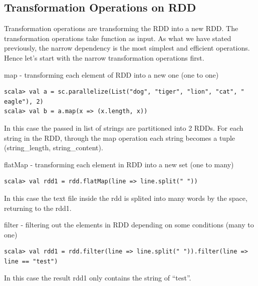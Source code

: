\documentclass[notheorems, aspectratio=54]{beamer}
\begin{document}

\subsection{Transformation Operations on RDD}
\begin{frame}[fragile]

Transformation operations are transforming the RDD into a new RDD. The transformation operations take function as input.
As what we have stated previously, the narrow dependency is the most simplest and efficient operations. Hence let's start
with the narrow transformation operations first.

\begin{block}{map - transforming each element of RDD into a new one (one to one)}
\begin{verbatim}
scala> val a = sc.parallelize(List("dog", "tiger", "lion", "cat", " eagle"), 2)
scala> val b = a.map(x => (x.length, x))  
\end{verbatim}
\end{block}
In this case the passed in list of strings are partitioned into 2 RDDs. For each string in the RDD, through the map operation
each string becomes a tuple (string\_length, string\_content).

\end{frame}


\begin{frame}[fragile]

\begin{block}{flatMap - transforming each element in RDD into a new set (one to many)}
\begin{verbatim}
scala> val rdd1 = rdd.flatMap(line => line.split(" "))  
\end{verbatim}
\end{block}
In this case the text file inside the rdd is splited into many words by the space, returning to the rdd1. 

\begin{block}{filter - filtering out the elements in RDD depending on some conditions (many to one)}
\begin{verbatim}
scala> val rdd1 = rdd.filter(line => line.split(" ")).filter(line => line == "test")  
\end{verbatim}
\end{block}
In this case the result rdd1 only contains the string of ``test''.

\end{frame}
\end{document}
